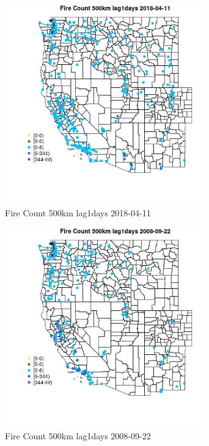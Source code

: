 \begin{figure} 
\centering  
\includegraphics[width=0.77\textwidth]{Code_Outputs/Report_ML_input_PM25_Step4_part_e_de_duplicated_aves_compiled_2019-05-18wNAs_MapObsFire_Count_500km_lag1days2018-04-11.jpg} 
\caption{\label{fig:Report_ML_input_PM25_Step4_part_e_de_duplicated_aves_compiled_2019-05-18wNAsMapObsFire_Count_500km_lag1days2018-04-11}Fire Count 500km lag1days 2018-04-11} 
\end{figure} 
 

\begin{figure} 
\centering  
\includegraphics[width=0.77\textwidth]{Code_Outputs/Report_ML_input_PM25_Step4_part_e_de_duplicated_aves_compiled_2019-05-18wNAs_MapObsFire_Count_500km_lag1days2008-09-22.jpg} 
\caption{\label{fig:Report_ML_input_PM25_Step4_part_e_de_duplicated_aves_compiled_2019-05-18wNAsMapObsFire_Count_500km_lag1days2008-09-22}Fire Count 500km lag1days 2008-09-22} 
\end{figure} 
 

